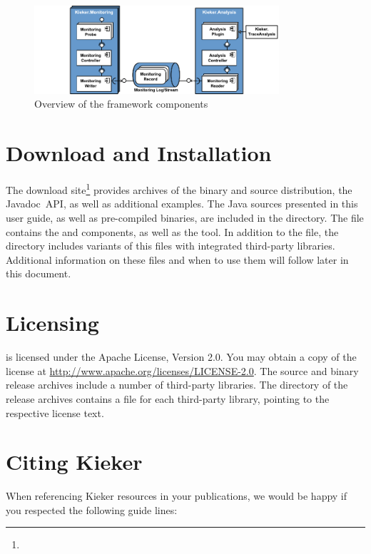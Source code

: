 		\begin{figure}[H]\centering
			\includegraphics[width=0.81\textwidth]{images/kiekerComponentDiagram-woCloud-bw-w-record-newNames-withTraceAnalysis-colors}
			
			\caption{Overview of the framework components}
			\label{fig:KiekerComponentDiagram}
		\end{figure}
	
	\section{Download and Installation}
		
		The \Kieker{} download site\footnote{\KiekerDownloadURL{}} provides archives of the binary and source distribution, the Javadoc~API, as well as additional examples. The Java sources presented in this user guide, as well as pre-compiled binaries, are included in the \file{\exampleDir/} directory. The file \file{\mainJar{}} contains the \KiekerMonitoringPart{} and \KiekerAnalysisPart{} components, as well as the \KiekerTraceAnalysis{} tool. In addition to the \file{\mainJar{}} file, the  directory includes variants of this  files with integrated third-party libraries. Additional information on these  files and when to use them will follow later in this document.
		
	\section{Licensing}
		\Kieker{} is licensed under the Apache License, Version 2.0. You may obtain a copy of the license at \url{http://www.apache.org/licenses/LICENSE-2.0}. The \Kieker{} source and binary release archives include a number of third-party libraries. The  directory of the release archives contains a  file for each third-party library, pointing to the respective license text.	
		
	\section{Citing Kieker}\label{sec:ch1:citingKieker}
		When referencing Kieker resources in your publications, we would be happy if you respected the following guide lines:

